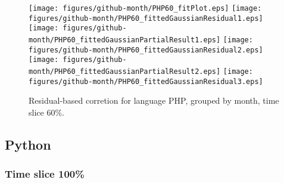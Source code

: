 \begin{figure}[hb]
\centering
{}
{\texttt{[image: figures/github-month/PHP60\_fitPlot.eps]}}
{\texttt{[image: figures/github-month/PHP60\_fittedGaussianResidual1.eps]}}
{\texttt{[image: figures/github-month/PHP60\_fittedGaussianPartialResult1.eps]}}
{\texttt{[image: figures/github-month/PHP60\_fittedGaussianResidual2.eps]}}
{\texttt{[image: figures/github-month/PHP60\_fittedGaussianPartialResult2.eps]}}
{\texttt{[image: figures/github-month/PHP60\_fittedGaussianResidual3.eps]}}
\caption{Residual-based corretion for language PHP, grouped by month, time slice 60\%.}
\end{figure}


\clearpage 
\newpage 


\subsection{Python}

\FloatBarrier

\subsubsection{Time slice 100\%}

